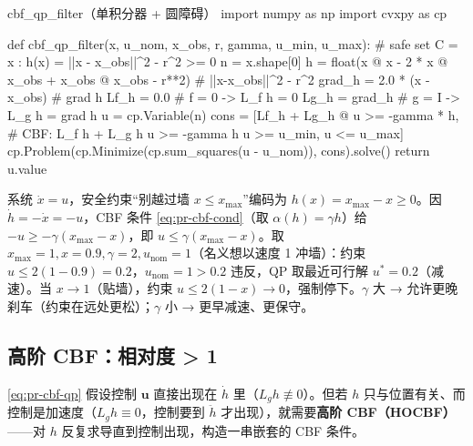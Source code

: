 \begin{codebox}[Python]{cbf\_qp\_filter（单积分器 + 圆障碍）}
import numpy as np
import cvxpy as cp

def cbf_qp_filter(x, u_nom, x_obs, r, gamma, u_min, u_max):
    # safe set C = {x : h(x) = ||x - x_obs||^2 - r^2 >= 0}
    n = x.shape[0]
    h = float(x @ x - 2 * x @ x_obs + x_obs @ x_obs - r**2)  # ||x-x_obs||^2 - r^2
    grad_h = 2.0 * (x - x_obs)         # grad h
    Lf_h = 0.0                         # f = 0  -> L_f h = 0
    Lg_h = grad_h                      # g = I  -> L_g h = grad h
    u = cp.Variable(n)
    cons = [Lf_h + Lg_h @ u >= -gamma * h,   # CBF: L_f h + L_g h u >= -gamma h
            u >= u_min, u <= u_max]
    cp.Problem(cp.Minimize(cp.sum_squares(u - u_nom)), cons).solve()
    return u.value
\end{codebox}

\begin{derivation}\label{der:pr-cbf-scalar}
系统 $\dot x=u$，安全约束“别越过墙 $x\le x_{\max}$”编码为 $h(x)=x_{\max}-x\ge0$。因 $\dot h=-\dot x=-u$，CBF 条件 \cref{eq:pr-cbf-cond}（取 $\alpha(h)=\gamma h$）给 $-u\ge-\gamma(x_{\max}-x)$，即 $u\le\gamma(x_{\max}-x)$。取 $x_{\max}=1,x=0.9,\gamma=2,u_{\mathrm{nom}}=1$（名义想以速度 1 冲墙）：约束 $u\le2(1-0.9)=0.2$，$u_{\mathrm{nom}}=1>0.2$ 违反，QP 取最近可行解 $u^*=0.2$（减速）。当 $x\to1$（贴墙），约束 $u\le2(1-x)\to0$，强制停下。$\gamma$ 大 → 允许更晚刹车（约束在远处更松）；$\gamma$ 小 → 更早减速、更保守。
\end{derivation}

\subsection{高阶 CBF：相对度 > 1}
\label{sec:pr-cbf-hocbf}

\cref{eq:pr-cbf-qp} 假设控制 $\mathbf{u}$ 直接出现在 $\dot h$ 里（$L_g h\not\equiv0$）。但若 $h$ 只与位置有关、而控制是加速度（$L_g h\equiv0$，控制要到 $\ddot h$ 才出现），就需要\textbf{高阶 CBF（HOCBF）}——对 $h$ 反复求导直到控制出现，构造一串嵌套的 CBF 条件\cite{xiao2022hocbf}。

